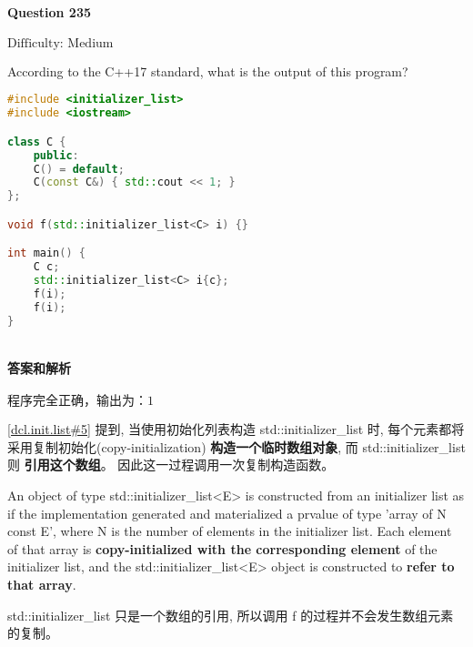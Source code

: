 \documentclass{article}
\begin{document}
	\paragraph*{Question 235} $\boxed{\text{Difficulty: Medium}} $			
	
	According to the C++17 standard, what is the output of this program?
	
	\begin{lstlisting}[language=C++]  		
#include <initializer_list>
#include <iostream>

class C {
	public:
	C() = default;
	C(const C&) { std::cout << 1; }
};

void f(std::initializer_list<C> i) {}

int main() {
	C c;
	std::initializer_list<C> i{c};
	f(i);
	f(i);
}
		
	\end{lstlisting}
	
	\paragraph*{答案和解析} $\boxed{\text{程序完全正确，输出为：1}} $
	
	\href{https://timsong-cpp.github.io/cppwp/n4659/dcl.init.list#5}{[dcl.init.list\#5]} 提到, 当使用初始化列表构造 std::initializer\_list 时, 每个元素都将采用复制初始化(copy-initialization) \textbf{构造一个临时数组对象}, 而 std::initializer\_list 则 \textbf{引用这个数组}。 因此这一过程调用一次复制构造函数。
	
	\begin{lightgrayleftbar}
		An object of type std​::​initializer\_­list<E> is constructed from an initializer list as if the implementation generated and materialized a prvalue of type 'array of N const E', where N is the number of elements in the initializer list. Each element of that array is \textbf{copy-initialized with the corresponding element} of the initializer list, and the std​::​initializer\_­list<E> object is constructed to \textbf{refer to that array}.
	\end{lightgrayleftbar}

	std::initializer\_list 只是一个数组的引用, 所以调用 f 的过程并不会发生数组元素的复制。
\end{document}
